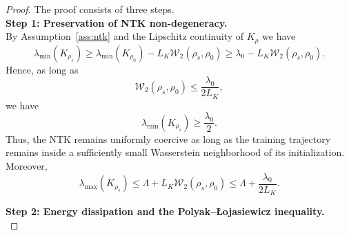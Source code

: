 \documentclass[11pt,a4wide]{article}
\theoremstyle{definition}
\newcommand{\Wass}{\mathcal{W}}
\begin{document}
\begin{proof} The proof consists of three steps. \\ 
{\bf Step 1: Preservation of NTK non-degeneracy.}\\
By Assumption~\ref{ass:ntk} and the Lipschitz continuity of $K_\rho$ we have 
\[
\lambda_{\min}(K_{\rho_s})
\ge
\lambda_{\min}(K_{\rho_0})
-
L_K
\Wass_2(\rho_s,\rho_0) \geq \lambda_0 - L_K
\Wass_2(\rho_s,\rho_0). 
\]
Hence, as long as 
\[
\Wass_2(\rho_s,\rho_0)
\le
\frac{\lambda_0}{2L_K},
\]
we have
\[
\lambda_{\min}(K_{\rho_s})
\ge
\frac{\lambda_0}{2}.
\]
Thus, the NTK remains uniformly coercive as long as the training trajectory remains inside a sufficiently small Wasserstein neighborhood of its initialization. Moreover,
$$
\lambda_{\max}(K_{\rho_s}) \leq \Lambda +L_K
\Wass_2(\rho_s,\rho_0) \leq \Lambda + \frac{\lambda_0}{2L_K}. 
$$

{\bf Step 2: Energy dissipation and the Polyak–Łojasiewicz inequality.} \\ 


\end{proof}
\end{document}

